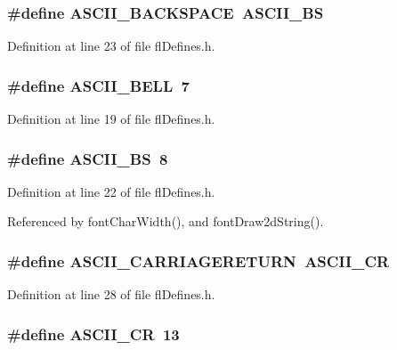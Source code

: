 \subsubsection{\setlength{\rightskip}{0pt plus 5cm}\#define ASCII\_\-BACKSPACE~ASCII\_\-BS}\label{flDefines_8h_97f70a2430c640e184380e20e1c1d0ea}




Definition at line 23 of file fl\-Defines.h.
\subsubsection{\setlength{\rightskip}{0pt plus 5cm}\#define ASCII\_\-BELL~7}\label{flDefines_8h_a4e9a7dee5a1249aebb466ca0eab8a37}




Definition at line 19 of file fl\-Defines.h.
\subsubsection{\setlength{\rightskip}{0pt plus 5cm}\#define ASCII\_\-BS~8}\label{flDefines_8h_74cfd0b97396b41e6cbb25de858ece5b}




Definition at line 22 of file fl\-Defines.h.

Referenced by font\-Char\-Width(), and font\-Draw2d\-String().
\subsubsection{\setlength{\rightskip}{0pt plus 5cm}\#define ASCII\_\-CARRIAGERETURN~ASCII\_\-CR}\label{flDefines_8h_f7f8f4d42704bc2f5d8fec34a29dab6a}




Definition at line 28 of file fl\-Defines.h.
\subsubsection{\setlength{\rightskip}{0pt plus 5cm}\#define ASCII\_\-CR~13}\label{flDefines_8h_089ed4925403ab02a05e603967c74579}




